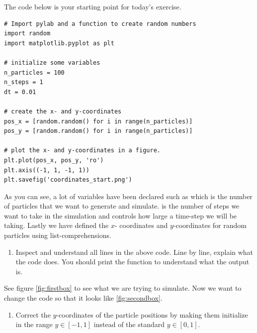 \documentclass{article}
\begin{document}
The code below is your starting point for today's exercise.

\begin{lstlisting}
# Import pylab and a function to create random numbers
import random
import matplotlib.pyplot as plt

# initialize some variables
n_particles = 100
n_steps = 1
dt = 0.01

# create the x- and y-coordinates
pos_x = [random.random() for i in range(n_particles)]
pos_y = [random.random() for i in range(n_particles)]

# plot the x- and y-coordinates in a figure.
plt.plot(pos_x, pos_y, 'ro')
plt.axis((-1, 1, -1, 1))
plt.savefig('coordinates_start.png')

\end{lstlisting}

As you can see, a lot of variables have been declared such as
 which
is the number of particles that we want to generate and simulate.
 is
the number of steps we want to take in the simulation
and  controls how large a time-step we will be taking.
Lastly we have defined the
$x$- coordinates and
$y$-coordinates for
 random particles using list-comprehensions.

\begin{enumerate}
  \item Inspect and understand all lines in the above code.
    Line by line, explain what the code does.
    You should print the  function
    to understand what the output is.
\end{enumerate}

See figure \ref{fig:firstbox} to see what we are trying to simulate.
Now we want to change the code so that it looks like \ref{fig:secondbox}.

\begin{enumerate}
  \item Correct the $y$-coordinates of the particle positions by making them
    initialize in the range $y \in [-1,1]$ instead of the standard $y \in [0,1]$.
\end{enumerate}
\end{document}
